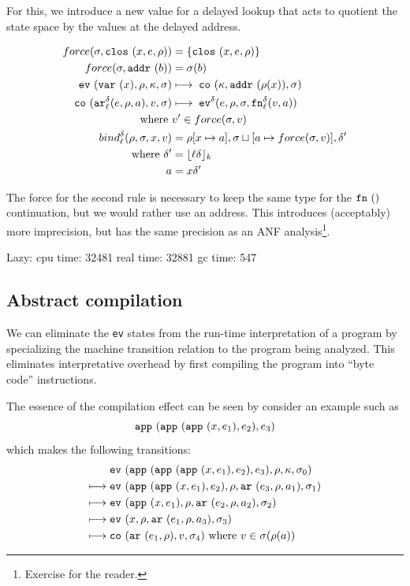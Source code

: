 \documentclass[preprint,onecolumn,9pt]{sigplanconf} %
\begin{document}
For this, we introduce a new value for a delayed lookup that acts to
quotient the state space by the values at the delayed address.

\begin{align*}
force(\msto,\clos{\mvar,\mexp,\menv}) &= \{\clos{\mvar,\mexp,\menv}\}\\
force(\msto,\saddr\maddralt) &= \msto(\maddralt)\\
\ev{\svar{\mvar},\menv,\mkont,\msto} &\machstep\;
\co{\mkont,\saddr{\menv(\mvar)},\msto} \\
\co{\kar[^\mcntr_\mlab]{\mexp,\menv,\maddr},v,\msto}
&\machstep\;
\ev[^\mcntr]{\mexp,\menv,\msto,\kfn[^\mcntr_\mlab]{\mval,\maddr}} \\
\mbox{where } &\mval' \in force(\msto,\mval) \\
bind^\mcntr_\mlab(\menv,\msto,\mvar,\mval) &= \menv[\mvar \mapsto
  \maddr], \msto\sqcup[\maddr \mapsto force(\msto, \mval)], \mcntr' \\
\mbox{where } \mcntr' &= \lfloor\mlab\mcntr\rfloor_k \\
              \maddr &= \mvar\mcntr'
\end{align*}

The force for the second rule is necessary to keep the same type for
the \(\kfn{}\) continuation, but we would rather use an address. This
introduces (acceptably) more imprecision, but has the same precision as an ANF
analysis\footnote{Exercise for the reader.}.

Lazy:
   cpu time: 32481 real time: 32881 gc time: 547

\subsection{Abstract compilation}

We can eliminate the {\tt ev} states from the run-time interpretation
of a program by specializing the machine transition relation to the
program being analyzed. This eliminates interpretative overhead by
first compiling the program into ``byte code'' instructions.

The essence of the compilation effect can be seen by consider an example
such as
\[
\sapp{\sapp{\sapp\mvar{\mexp_1}}{\mexp_2}}{\mexp_3}
\]
which makes the following transitions:
\begin{align}
& \ev{\sapp{\sapp{\sapp\mvar{\mexp_1}}{\mexp_2}}{\mexp_3},\menv,\mkont,\msto_0}\\
\machstep\; &
\ev{\sapp{\sapp\mvar{\mexp_1}}{\mexp_2},\menv,\kar{\mexp_3,\menv,\maddr_1},\msto_1}
\\
\machstep\; &
\ev{\sapp\mvar{\mexp_1},\menv,\kar{\mexp_2,\menv,\maddr_2},\msto_2}
\\
\machstep\; &
\ev{\mvar, \menv,\kar{\mexp_1,\menv,\maddr_3},\msto_3} %
\\
\machstep\; &
\co{\kar{\mexp_1,\menv},\mval,\msto_4} %
\mbox{ where } \mval \in \msto(\menv(\maddr))
\end{align}
\end{document}
